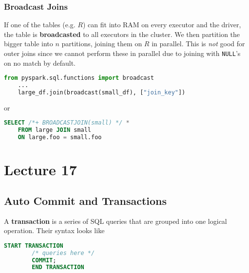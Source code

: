 \documentclass{report}
\newenvironment{definition}[1]{\begin{tcolorbox}[title={Definition: #1}]}{\end{tcolorbox}}
\renewcommand{\bf}[1]{\textbf{{#1}}}
\renewcommand{\tt}[1]{\texttt{{#1}}}
\renewcommand{\it}[1]{\textit{{#1}}}
\begin{document}
\subsection{Broadcast Joins}
If one of the tables (e.g. $R$) can fit into RAM on every executor and the
driver, the table is \bf{broadcasted} to all executors in the cluster. We then
partition the bigger table into $n$ partitions, joining them on $R$ in parallel.
This is \it{not} good for outer joins since we cannot perform these in parallel
due to joining with \tt{NULL}'s on no match by default.
\lstset{ basicstyle=\small\ttfamily, mathescape }
{
    \centering
    \begin{lstlisting}[language=Python, style=colorEX]
    from pyspark.sql.functions import broadcast
    ...
    large_df.join(broadcast(small_df), ["join_key"])
    \end{lstlisting}
    \par
}
or
{
    \centering
    \begin{lstlisting}[language=SQL, style=colorEX]
    SELECT /*+ BROADCASTJOIN(small) */ *
    FROM large JOIN small
    ON large.foo = small.foo
    \end{lstlisting}
    \par
}


\chapter{Lecture 17}
\section{Auto Commit and Transactions}
\begin{definition}{Transaction}
    A \bf{transaction} is a series of SQL queries that are grouped into one
    logical operation. Their syntax looks like
    \begin{lstlisting}[language=SQL, style=colorEX]
        START TRANSACTION
        /* queries here */
        COMMIT;
        END TRANSACTION
    \end{lstlisting}
\end{definition}
\end{document}
